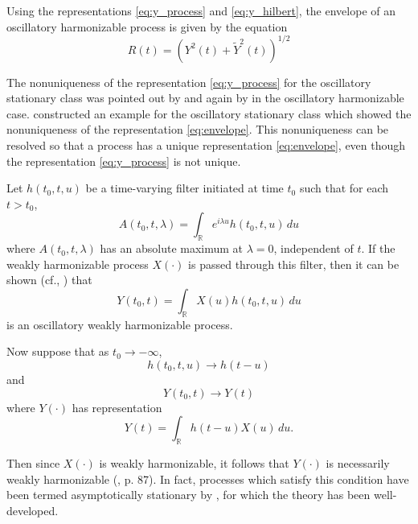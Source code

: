 \documentclass[12pt]{article}
\begin{document}
Using the representations \eqref{eq:y_process} and \eqref{eq:y_hilbert}, the envelope of an oscillatory harmonizable process is given by the equation
\begin{equation}
    R(t) = (Y^2(t) + \tilde{Y}^2(t))^{1/2}
    \label{eq:envelope}
\end{equation}

The nonuniqueness of the representation \eqref{eq:y_process} for the oscillatory stationary class was pointed out by \cite{Priestley1965} and again by \cite{SwiftToAppear} in the oscillatory harmonizable case. \cite{Hasofer1979} constructed an example for the oscillatory stationary class which showed the nonuniqueness of the representation \eqref{eq:envelope}. This nonuniqueness can be resolved so that a process has a unique representation \eqref{eq:envelope}, even though the representation \eqref{eq:y_process} is not unique.

Let $h(t_0, t, u)$ be a time-varying filter initiated at time $t_0$ such that for each $t > t_0$,
\begin{equation}
    A(t_0, t, \lambda) = \int_{\mathbb{R}} e^{i\lambda u} h(t_0, t, u) \, du
    \label{eq:filter_a}
\end{equation}
where $A(t_0, t, \lambda)$ has an absolute maximum at $\lambda = 0$, independent of $t$. If the weakly harmonizable process $X(\cdot)$ is passed through this filter, then it can be shown (cf., \cite{SwiftToAppear}) that
\begin{equation}
    Y(t_0, t) = \int_{\mathbb{R}} X(u) h(t_0, t, u) \, du
    \label{eq:y_t0_t}
\end{equation}
is an oscillatory weakly harmonizable process.

Now suppose that as $t_0 \to -\infty$,
\begin{equation}
    h(t_0, t, u) \to h(t - u)
    \label{eq:h_limit}
\end{equation}
and
\begin{equation}
    Y(t_0, t) \to Y(t)
    \label{eq:y_limit}
\end{equation}
where $Y(\cdot)$ has representation
\begin{equation}
    Y(t) = \int_{\mathbb{R}} h(t - u) X(u) \, du.
    \label{eq:y_representation}
\end{equation}

Then since $X(\cdot)$ is weakly harmonizable, it follows that $Y(\cdot)$ is necessarily weakly harmonizable (\cite{ChangRao1986}, p. 87). In fact, processes which satisfy this condition have been termed asymptotically stationary by \cite{Parzen1962}, for which the theory has been well-developed.
\end{document}
